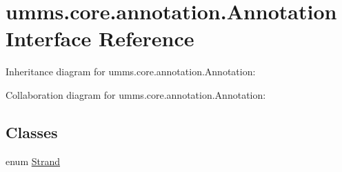 \hypertarget{interfaceumms_1_1core_1_1annotation_1_1_annotation}{\section{umms.\+core.\+annotation.\+Annotation Interface Reference}
\label{interfaceumms_1_1core_1_1annotation_1_1_annotation}
}


Inheritance diagram for umms.\+core.\+annotation.\+Annotation\+:


Collaboration diagram for umms.\+core.\+annotation.\+Annotation\+:
\subsection*{Classes}
\begin{DoxyCompactItemize}
\item 
enum \hyperlink{enumumms_1_1core_1_1annotation_1_1_annotation_1_1_strand}{Strand}
\end{DoxyCompactItemize}
